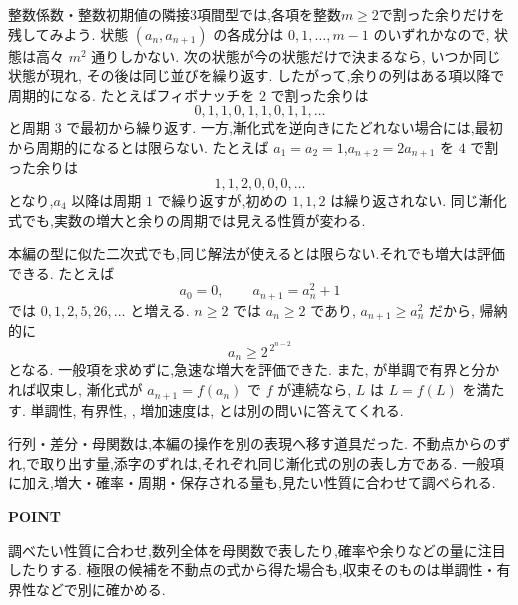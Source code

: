 整数係数・整数初期値の隣接3項間型では,各項を整数$m\ge2$で割った余りだけを残してみよう.
状態 $(a_n,a_{n+1})$ の各成分は $0,1,\ldots,m-1$ のいずれかなので, 状態は高々 $m^2$ 通りしかない.
次の状態が今の状態だけで決まるなら, いつか同じ状態が現れ, その後は同じ並びを繰り返す.
したがって,余りの列はある項以降で周期的になる.
たとえばフィボナッチを $2$ で割った余りは
\[
  0,1,1,0,1,1,0,1,1,\ldots
\]
と周期 $3$ で最初から繰り返す.
一方,漸化式を逆向きにたどれない場合には,最初から周期的になるとは限らない.
たとえば $a_1=a_2=1$,$a_{n+2}=2a_{n+1}$ を $4$ で割った余りは
\[
  1,1,2,0,0,0,\ldots
\]
となり,$a_4$ 以降は周期 $1$ で繰り返すが,初めの $1,1,2$ は繰り返されない.
同じ漸化式でも,実数の増大と余りの周期では見える性質が変わる.

本編の型に似た二次式でも,同じ解法が使えるとは限らない.それでも増大は評価できる.
たとえば
\[
  a_0=0,\qquad a_{n+1}=a_n^2+1
\]
では $0,1,2,5,26,\ldots$ と増える.
$n\ge2$ では $a_n\ge2$ であり, $a_{n+1}\ge a_n^2$ だから, 帰納的に
\[
  a_n\ge 2^{\,2^{n-2}}
\]
となる.
一般項を求めずに,急速な増大を評価できた.
また, が単調で有界と分かれば収束し, 漸化式が $a_{n+1}=f(a_n)$ で $f$ が連続なら,  $L$ は $L=f(L)$ を満たす.
単調性, 有界性, , 増加速度は, とは別の問いに答えてくれる.

行列・差分・母関数は,本編の操作を別の表現へ移す道具だった.
不動点からのずれ,で取り出す量,添字のずれは,それぞれ同じ漸化式の別の表し方である.
一般項に加え,増大・確率・周期・保存される量も,見たい性質に合わせて調べられる.

\begin{bookpoint}
  \textbf{POINT}\par
  調べたい性質に合わせ,数列全体を母関数で表したり,確率や余りなどの量に注目したりする.
  極限の候補を不動点の式から得た場合も,収束そのものは単調性・有界性などで別に確かめる.
\end{bookpoint}
